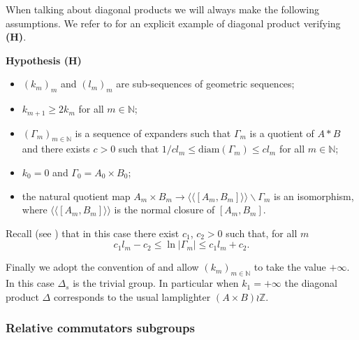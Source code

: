 \documentclass[english, 11pt, a4paper]{article}
\theoremstyle{definition}
\numberwithin{equation}{section}
\newcommand{\bN}{\mathbb{N}}
\newcommand{\bZ}{\mathbb{Z}}
\newcommand{\diam}[1]{\mathrm{diam}\left( {#1} \right)}
\newcommand{\BZ}{\Delta}
\newcommand{\Clm}{c}
\begin{document}
When talking about diagonal products we will always make the following
assumptions. We refer to \cite[Example 2.3]{BZ} for an explicit example of
diagonal product verifying \textbf{(H)}.

\begin{HypBox}
  \textbf{Hypothesis (H)}
  \begin{itemize}
  \item $(k_m)_m$ and $(l_m)_m$ are sub-sequences of geometric
    sequences;
  \item $k_{m+1}\geq 2 k_m$ for all $m\in \bN$;
  \item $(\Gamma_m)_{m\in \bN}$ is a sequence of expanders such that $\Gamma_m$
    is a quotient of $A*B$ and there exists $\Clm >0$ such that
    $1/\Clm l_m \leq \diam{\Gamma_m}\leq \Clm l_m$ for all $m\in \bN$;
  \item $k_0=0$ and $\Gamma_0=A_0\times B_0$;
  \item the natural quotient map $A_m\times B_m\rightarrow
      \langle{ \langle{\left[A_m,B_m\right]}}  \rangle \rangle \backslash \Gamma_m$
    is an isomorphism,  where $\langle{\langle{\left[A_m,B_m\right]}\rangle}\rangle $
    is the normal
    closure of $\left[A_m,B_m\right]$.
  \end{itemize}
\end{HypBox}
Recall (see \cite[page 9]{BZ}) that in this case there exist $c_1$, $c_2>0$ such
that, for all $m$
\begin{equation}
  \label{eq:encadrementlngammap}
  c_1 l_m -c_2 \leq \ln \left\vert {\Gamma_m}\right\vert \leq c_1l_m + c_2.
\end{equation}

Finally we adopt the convention of \cite[Notation 2.2]{BZ} and allow $(k_m)_{m\in \bN}$
to take the value $+\infty$. In this case $\BZ_s$ is the trivial group. In
particular when $k_1=+\infty$ the diagonal product $\BZ$ corresponds to the
usual lamplighter $(A\times B)\wr \bZ$. 

\subsubsection{Relative commutators subgroups}\label{subsec:Derivedfunctions}
\end{document}
